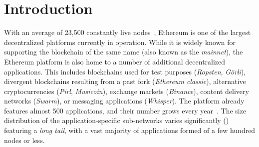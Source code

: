 

\section{Introduction}
With an average of 23,500 constantly live nodes~\cite{discv4-dns-lists}, Ethereum is one of the largest decentralized platforms currently in operation.
While it is widely known for supporting the blockchain of the same name (also known as the \emph{mainnet}), the Ethereum platform is also home to a number of additional decentralized applications.
This includes blockchains used for test purposes (\emph{Ropsten}, \emph{G\"orli}), divergent blockchains resulting from a past fork (\emph{Ethereum classic}), alternative cryptocurrencies (\emph{Pirl}, \emph{Musicoin}), exchange markets (\emph{Binance}), content delivery networks (\emph{Swarm}), or messaging applications (\emph{Whisper}).
The platform already features almost 500 applications, and their number grows every year~\cite{discv4-dns-lists}. The size distribution of the application-specific sub-networks varies significantly () featuring a \emph{long tail}, with a vast majority of applications formed of a few hundred nodes or less.

